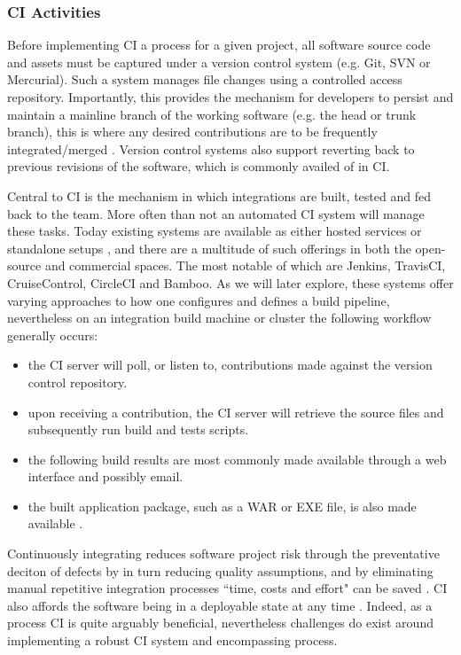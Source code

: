 \documentclass{report}
\begin{document}
\subsubsection{CI Activities}
Before implementing CI a process for a given project, all software source code
and assets must be captured under a version control system (e.g. Git, SVN or Mercurial).
Such a system manages file changes using a controlled access repository. Importantly,
this provides the mechanism for developers to persist and maintain a mainline branch of the working software 
(e.g. the head or trunk branch), this is where any desired contributions are to be frequently 
integrated/merged \citep{Vas}. Version control systems also support reverting back to
previous revisions of the software, which is commonly availed of in CI. 
\par
Central to CI is the mechanism in which integrations are built, tested and fed back to the team. 
More often than not an automated CI system will manage these tasks. Today existing systems
are available as either hosted services or standalone setups \citep{Gous}, and there are
a multitude of such offerings in both the open-source and commercial spaces. 
The most notable of which are Jenkins, TravisCI, CruiseControl, CircleCI and Bamboo. 
As we will later explore, these systems offer varying approaches to how one configures and
defines a build pipeline, nevertheless on an integration build machine or cluster the following workflow generally occurs:
\begin{itemize}  
\item the CI server will poll, or listen to, contributions 
made against the version control repository.
\item upon receiving a contribution, the CI 
server will retrieve the source files and subsequently run build and tests scripts. 
\item the following build results are most commonly made available through a web interface and possibly
email.
\item the built application package, such as a WAR or EXE file, is also made available \citep{Stahl}.
\end{itemize}
\par
Continuously integrating reduces software project risk through 
the preventative deciton of defects by in turn reducing quality 
assumptions, and by eliminating manual repetitive integration
processes ``time, costs and effort" can be saved \citep{Vas}.
CI also affords the software being in a deployable state at any time \citep{Jez}.
Indeed, as a process CI is quite arguably beneficial, nevertheless challenges 
do exist around implementing a robust CI system 
and encompassing process.
\end{document}
